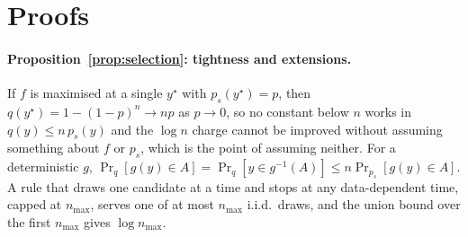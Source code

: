 \section{Proofs}\label{app:proofs}

\paragraph{Proposition~\ref{prop:selection}: tightness and extensions.}
If $f$ is maximised at a single $y^\star$ with $p_s(y^\star) = p$, then $q(y^\star) = 1-(1-p)^n \to np$ as
$p \to 0$, so no constant below $n$ works in $q(y) \le n\,p_s(y)$ and the $\log n$ charge cannot be
improved without assuming something about $f$ or $p_s$, which is the point of assuming neither. For a
deterministic $g$, $\Pr_q[g(y) \in A] = \Pr_q[y \in g^{-1}(A)] \le n\Pr_{p_s}[g(y) \in A]$. A rule that
draws one candidate at a time and stops at any data-dependent time, capped at $n_{\max}$, serves one of at
most $n_{\max}$ i.i.d.\ draws, and the union bound over the first $n_{\max}$ gives $\log n_{\max}$.

